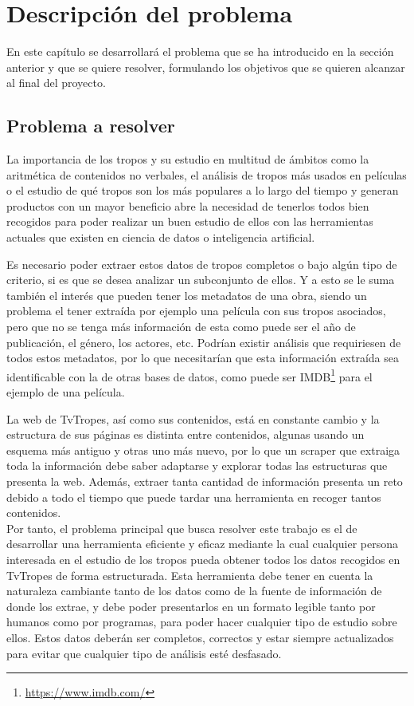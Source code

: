 \chapter{Descripción del problema}

En este capítulo se desarrollará el problema que se ha introducido en la sección anterior y que se quiere resolver, formulando los objetivos que se quieren alcanzar al final del proyecto.

\section{Problema a resolver}

La importancia de los tropos y su estudio en multitud de ámbitos como la aritmética de contenidos no verbales, el análisis de tropos más usados en películas o el estudio de qué tropos son los más populares a lo largo del tiempo y generan productos con un mayor beneficio abre la necesidad de tenerlos todos bien recogidos para poder realizar un buen estudio de ellos con las herramientas actuales que existen en ciencia de datos o inteligencia artificial. 

Es necesario poder extraer estos datos de tropos completos o bajo algún tipo de criterio, si es que se desea analizar un subconjunto de ellos. Y a esto se le suma también el interés que pueden tener los metadatos de una obra, siendo un problema el tener extraída por ejemplo una película con sus tropos asociados, pero que no se tenga más información de esta como puede ser el año de publicación, el género, los actores, etc. Podrían existir análisis que requiriesen de todos estos metadatos, por lo que necesitarían que esta información extraída sea identificable con la de otras bases de datos, como puede ser IMDB\footnote{\url{https://www.imdb.com/}} para el ejemplo de una película.

La web de TvTropes, así como sus contenidos, está en constante cambio y la estructura de sus páginas es distinta entre contenidos, algunas usando un esquema más antiguo y otras uno más nuevo, por lo que un scraper que extraiga toda la información debe saber adaptarse y explorar todas las estructuras que presenta la web. Además, extraer tanta cantidad de información presenta un reto debido a todo el tiempo que puede tardar una herramienta en recoger tantos contenidos.\\

Por tanto, el problema principal que busca resolver este trabajo es el de desarrollar una herramienta eficiente y eficaz mediante la cual cualquier persona interesada en el estudio de los tropos pueda obtener todos los datos recogidos en TvTropes de forma estructurada. Esta herramienta debe tener en cuenta la naturaleza cambiante tanto de los datos como de la fuente de información de donde los extrae, y debe poder presentarlos en un formato legible tanto por humanos como por programas, para poder hacer cualquier tipo de estudio sobre ellos. Estos datos deberán ser completos, correctos y estar siempre actualizados para evitar que cualquier tipo de análisis esté desfasado.\\

